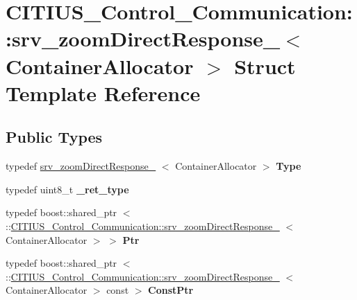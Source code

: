 \hypertarget{struct_c_i_t_i_u_s___control___communication_1_1srv__zoom_direct_response__}{\section{\-C\-I\-T\-I\-U\-S\-\_\-\-Control\-\_\-\-Communication\-:\-:srv\-\_\-zoom\-Direct\-Response\-\_\-$<$ \-Container\-Allocator $>$ \-Struct \-Template \-Reference}
\label{struct_c_i_t_i_u_s___control___communication_1_1srv__zoom_direct_response__}
}
\subsection*{\-Public \-Types}
\begin{DoxyCompactItemize}
\item 
\hypertarget{struct_c_i_t_i_u_s___control___communication_1_1srv__zoom_direct_response___a04c8b3f5a0c2b911d9bae3c0dcb484bf}{typedef \*
\hyperlink{struct_c_i_t_i_u_s___control___communication_1_1srv__zoom_direct_response__}{srv\-\_\-zoom\-Direct\-Response\-\_\-}\*
$<$ \-Container\-Allocator $>$ {\bfseries \-Type}}\label{struct_c_i_t_i_u_s___control___communication_1_1srv__zoom_direct_response___a04c8b3f5a0c2b911d9bae3c0dcb484bf}

\item 
\hypertarget{struct_c_i_t_i_u_s___control___communication_1_1srv__zoom_direct_response___ac46cb9532178b44c51cd0d41dd0d20b9}{typedef uint8\-\_\-t {\bfseries \-\_\-ret\-\_\-type}}\label{struct_c_i_t_i_u_s___control___communication_1_1srv__zoom_direct_response___ac46cb9532178b44c51cd0d41dd0d20b9}

\item 
\hypertarget{struct_c_i_t_i_u_s___control___communication_1_1srv__zoom_direct_response___a3098b4205aae6d98a38cfbd4d387e53a}{typedef boost\-::shared\-\_\-ptr\*
$<$ \-::\hyperlink{struct_c_i_t_i_u_s___control___communication_1_1srv__zoom_direct_response__}{\-C\-I\-T\-I\-U\-S\-\_\-\-Control\-\_\-\-Communication\-::srv\-\_\-zoom\-Direct\-Response\-\_\-}\*
$<$ \-Container\-Allocator $>$ $>$ {\bfseries \-Ptr}}\label{struct_c_i_t_i_u_s___control___communication_1_1srv__zoom_direct_response___a3098b4205aae6d98a38cfbd4d387e53a}

\item 
\hypertarget{struct_c_i_t_i_u_s___control___communication_1_1srv__zoom_direct_response___adca45bb8a2d7346c0f86b244bea2d57b}{typedef boost\-::shared\-\_\-ptr\*
$<$ \-::\hyperlink{struct_c_i_t_i_u_s___control___communication_1_1srv__zoom_direct_response__}{\-C\-I\-T\-I\-U\-S\-\_\-\-Control\-\_\-\-Communication\-::srv\-\_\-zoom\-Direct\-Response\-\_\-}\*
$<$ \-Container\-Allocator $>$ const  $>$ {\bfseries \-Const\-Ptr}}\label{struct_c_i_t_i_u_s___control___communication_1_1srv__zoom_direct_response___adca45bb8a2d7346c0f86b244bea2d57b}

\end{DoxyCompactItemize}
